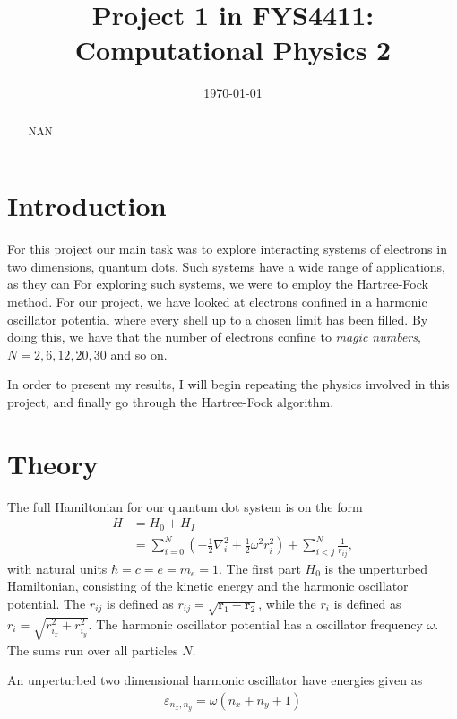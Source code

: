 \documentclass[11pt,twocolumn]{article}
\title{Project 1 in FYS4411: Computational Physics 2}
\author{}
\date{\today}
\begin{document}
\maketitle

\begin{abstract}
NAN
\end{abstract}

\section{Introduction}
For this project our main task was to explore interacting systems of electrons in two dimensions, quantum dots. Such systems have a wide range of applications, as they can  For exploring such systems, we were to employ the Hartree-Fock method. For our project, we have looked at electrons confined in a harmonic oscillator potential where every shell up to a chosen limit has been filled. By doing this, we have that the number of electrons confine to \textit{magic numbers}, $N = 2, 6, 12, 20, 30$ and so on.

In order to present my results, I will begin repeating the physics involved in this project, and finally go through the Hartree-Fock algorithm.

\section{Theory}
The full Hamiltonian for our quantum dot system is on the form
\begin{align}
	H &= H_0 + H_I \nonumber \\
	&= \sum^N_{i=0} \left( -\frac{1}{2}\nabla^2_i + \frac{1}{2}\omega^2 r^2_i \right) + \sum^N_{i<j}\frac{1}{r_{ij}},
	\label{eq:full-hamiltonian}
\end{align}
with natural units $\hbar = c = e = m_e = 1$. The first part $H_0$ is the unperturbed Hamiltonian, consisting of the kinetic energy and the harmonic oscillator potential. The $r_{ij}$ is defined as $r_{ij} = \sqrt{\mathbf{r}_1 - \mathbf{r}_2}$, while the $r_i$ is defined as $r_i = \sqrt{r^2_{i_x} + r^2_{i_y}}$. The harmonic oscillator potential has a oscillator frequency $\omega$. The sums run over all particles $N$.

An unperturbed two dimensional harmonic oscillator have energies given as
\begin{align}
	\varepsilon_{n_x,n_y} = \omega(n_x + n_y + 1)
	\label{eq:ho-energy-cartesian}
\end{align}
\end{document}
